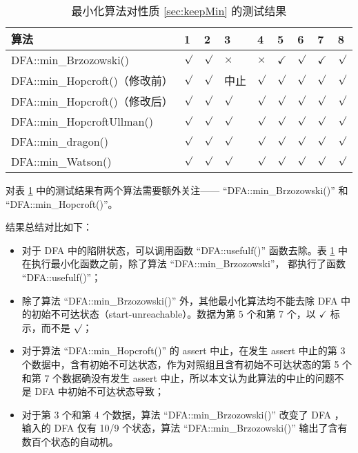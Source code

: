 \begin{table}[!htbp]
    \caption{ 最小化算法对性质 \ref{sec:keepMin} 的测试结果 }
    \label{tab:KeepMinResult}
    \centering
    \small%
    \setlength{\tabcolsep}{4pt}%
    \renewcommand{\arraystretch}{1.2}%
    \begin{tabular}{l|p{2em}<{\centering} p{2em}<{\centering} p{2em}<{\centering} p{2em}<{\centering} p{2em}<{\centering} p{2em}<{\centering} p{2em}<{\centering} p{2em}<{\centering}}  %
        \toprule %
        算法 & 1 & 2 & 3 & 4 &  5 &  6  & 7 & 8  \\
        \midrule
        DFA::min\_Brzozowski()        & $\surd$ & $\surd$ & $\times$  & $\times$  & $\checkmark$ & $\surd$ & $\checkmark$ & $\surd$ \\
        DFA::min\_Hopcroft()（修改前） & $\surd$ & $\surd$ & 中止    & $\surd$     & $\surd$ & $\surd$ & $\surd$ & $\surd$ \\
        DFA::min\_Hopcroft()（修改后） & $\surd$ & $\surd$ & $\surd$ & $\surd$     & $\surd$ & $\surd$ & $\surd$ & $\surd$ \\
        DFA::min\_HopcroftUllman()    & $\surd$ & $\surd$ & $\surd$ & $\surd$     & $\surd$ & $\surd$ & $\surd$ & $\surd$ \\
        DFA::min\_dragon()            & $\surd$ & $\surd$ & $\surd$ & $\surd$     & $\surd$ & $\surd$ & $\surd$ & $\surd$ \\
        DFA::min\_Watson()            & $\surd$ & $\surd$ & $\surd$ & $\surd$     & $\surd$ & $\surd$ & $\surd$ & $\surd$ \\
        \bottomrule%
    \end{tabular}
\end{table}

对表 \ref{tab:KeepMinResult} 中的测试结果有两个算法需要额外关注—— “DFA::min\_Brzozowski()” 和 “DFA::min\_Hopcroft()”。

结果总结对比如下：
\begin{itemize}
    \item 对于 DFA 中的陷阱状态，可以调用函数 “DFA::usefulf()” 函数去除。表 \ref{tab:KeepMinResult} 中在执行最小化函数之前，除了算法 “DFA::min\_Brzozowski”， 都执行了函数 “DFA::usefulf()”；
    \item 除了算法 “DFA::min\_Brzozowski()” 外，其他最小化算法均不能去除 DFA 中的初始不可达状态（start-unreachable）。数据为第 5 个和第 7 个，以 $\checkmark$ 标示，而不是 $\surd$；
    \item 对于算法 “DFA::min\_Hopcroft()” 的 assert 中止，在发生 assert 中止的第 3 个数据中，含有初始不可达状态，作为对照组且含有初始不可达状态的第 5 个和第 7 个数据确没有发生 assert 中止，所以本文认为此算法的中止的问题不是 DFA 中初始不可达状态导致；
    \item 对于第 3 个和第 4 个数据，算法 “DFA::min\_Brzozowski()” 改变了 DFA ，输入的 DFA 仅有 10/9 个状态，算法 “DFA::min\_Brzozowski()” 输出了含有数百个状态的自动机。
\end{itemize}



